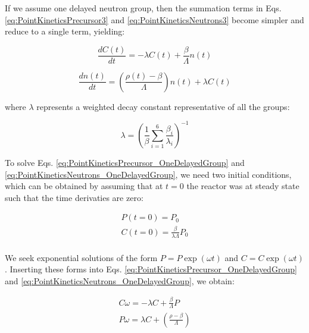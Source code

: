 \documentclass[10pt]{article}
\begin{document}
\begin{flushleft}
If we assume one delayed neutron group, then the summation terms in Eqs. \ref{eq:PointKineticsPrecursor3} and \ref{eq:PointKineticsNeutrons3} become simpler and reduce to a single term, yielding:

\begin{equation}
\label{eq:PointKineticsPrecursor_OneDelayedGroup}
\frac{dC(t)}{dt}=-\lambda C(t)+\frac{\beta}{\Lambda}n(t)
\end{equation} 

\begin{equation}
\label{eq:PointKineticsNeutrons_OneDelayedGroup}
\frac{dn(t)}{dt}=\left(\frac{\rho(t)-\beta}{\Lambda}\right)n(t)+\lambda C(t)
\end{equation} 

where \(\lambda\) represents a weighted decay constant representative of all the groups:

\begin{equation}
\label{eq:Lambda_OneGroup}
\lambda=\left(\frac{1}{\beta}\sum_{i=1}^{6}\frac{\beta_i}{\lambda_i}\right)^{-1}
\end{equation} 

To solve Eqs. \ref{eq:PointKineticsPrecursor_OneDelayedGroup} and \ref{eq:PointKineticsNeutrons_OneDelayedGroup}, we need two initial conditions, which can be obtained by assuming that at \(t=0\) the reactor was at steady state such that the time derivaties are zero:

\begin{equation}
\label{eq:PKE_OneGroup_ICs}
\begin{aligned}
P(t=0)=P_0\\
C(t=0)=\frac{\beta}{\lambda\Lambda}P_0\\
\end{aligned}
\end{equation} 

We seek exponential solutions of the form \(P=P\exp(\omega t)\) and \(C=C\exp(\omega t)\). Inserting these forms into Eqs. \ref{eq:PointKineticsPrecursor_OneDelayedGroup} and \ref{eq:PointKineticsNeutrons_OneDelayedGroup}, we obtain:

\begin{equation}
\label{eq:PKE_OneGroup_AssumedForm}
\begin{aligned}
C\omega=-\lambda C+\frac{\beta}{\Lambda}P\\
P\omega=\lambda C+\left(\frac{\rho-\beta}{\Lambda}\right)\\
\end{aligned}
\end{equation} 


\end{flushleft}
\end{document}

